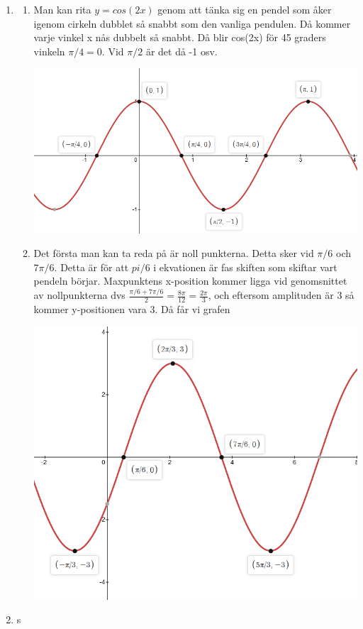 \documentclass[a4paper,12pt]{article}
\begin{document}
\begin{enumerate}
    \item
          \begin{enumerate}
              \item Man kan rita $y=cos(2x)$ genom att tänka sig en pendel som åker igenom cirkeln dubblet
                    så snabbt som den vanliga pendulen. Då kommer varje vinkel x nås dubbelt så snabbt. Då blir
                    cos(2x) för 45 graders vinkeln $\pi/4=0$. Vid $\pi/2$ är det då -1 osv.

                    \includegraphics[scale=0.5]{Figur2.png}

              \item Det första man kan ta reda på är noll punkterna. Detta sker vid $\pi/6$ och $7\pi/6$.
                    Detta är för att $pi/6$ i ekvationen är fas skiften som skiftar vart pendeln börjar.
                    Maxpunktens x-position kommer ligga vid genomsnittet
                    av nollpunkterna dvs $\frac{\pi/6+7\pi/6}{2}=\frac{8\pi}{12}=\frac{2\pi}{3}$, och eftersom
                    amplituden är 3 så kommer y-positionen vara 3. Då får vi grafen

                    \includegraphics[scale=0.5]{Figur3.png}
          \end{enumerate}

    \item s
\end{enumerate}
\end{document}

